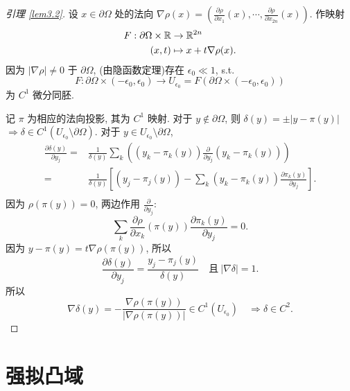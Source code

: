 \begin{proof}[引理 \ref{lem3.2}]
    设 $x \in \partial \Omega $ 处的法向 $\nabla \rho (x)=\left( \frac{\partial \rho }{\partial x_1}(x),\cdots ,\frac{\partial \rho }{\partial x_{2n}}(x) \right)$. 作映射 
    $$ \begin{aligned}
        F:\partial \Omega  \times {\mathbb R} &\to {\mathbb R}^{2n}\\
        (x,t) &\mapsto x+t \nabla \rho (x).\\
    \end{aligned}  $$
   因为 $\left| \nabla \rho  \right| \neq 0$ 于 $\partial \Omega $, (由隐函数定理)存在 $\epsilon _0 \ll 1$, s.t. 
   $$ F: \partial \Omega \times (-\epsilon _0,\epsilon _0) \to U_{\epsilon _0}=  F (\partial \Omega \times (-\epsilon _0,\epsilon _0)) $$   
    为 $C^1$ 微分同胚.  
    
    记 $\pi $ 为相应的法向投影, 其为 $C^1$ 映射.  
    对于 $y \not \in \partial \Omega $, 则 $\delta (y)=\pm \left| y-\pi (y) \right| $ $\Rightarrow \delta \in C^1(U_{\epsilon _{0}} \setminus \partial \Omega )$.   
    对于 $y \in U_{\epsilon _0} \setminus \partial \Omega $, 
    $$ \begin{aligned}
         \frac{\partial \delta (y)}{\partial y_j} =& \frac{1}{\delta (y)} \sum_{k} \left( (y_k-\pi _k(y)) \frac{\partial }{\partial y_j}(y_k-\pi _k(y)) \right)\\
        =& \frac{1}{\delta (y)} \left[ (y_j-\pi _j(y))-\sum_{k}^{}(y_k-\pi _k(y)) \frac{\partial \pi _k(y)}{\partial y_j} \right].\\
    \end{aligned} $$ 
因为 $\rho (\pi (y))=0$, 两边作用 $\frac{\partial }{\partial y_j}$: 
$$ \sum_{k}^{} \frac{\partial \rho }{\partial x_k}(\pi (y)) \frac{\partial \pi _k (y)}{\partial y_j}=0.$$ 
因为 $y-\pi (y)=t \nabla \rho (\pi (y))$, 所以 
$$ \frac{\partial \delta (y)}{\partial y_j} = \frac{y_j-\pi _j(y)}{\delta (y)} \quad \text{且}~ \left| \nabla \delta  \right| =1.$$  
所以 
\[ \nabla \delta (y)=-\frac{\nabla \rho (\pi (y))}{\left| \nabla \rho (\pi (y)) \right| } \in C^1 (U_{\epsilon _0}) \quad \Rightarrow \delta \in C^2 .\]
\end{proof}



\section{强拟凸域}


